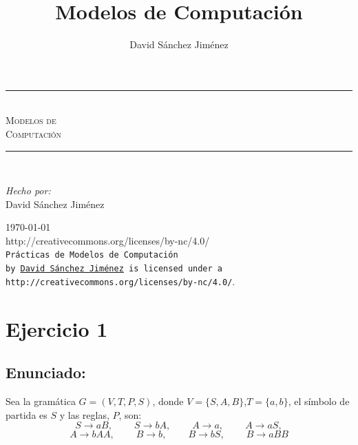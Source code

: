 \documentclass[10pt,a4paper,spanish]{report}
\title{Modelos de Computación}
\author{David Sánchez Jiménez}
\newcommand{\HRule}{\rule{\linewidth}{0.5mm}} %
\begin{document}
\begin{titlepage}
	\begin{center}
		\HRule \\[0.8cm]
		\textsc{\huge Modelos de\\[0.5cm] Computación}\\[1.6cm]
		\HRule \\[1cm]
		\begin{flushleft}
			\emph{Hecho por:}\\
			David Sánchez Jiménez
		\end{flushleft}
		\vspace{12cm}
		\large{\today}\\
		\vspace{0.5cm}
		{http://creativecommons.org/licenses/by-nc/4.0/}\\[0.5cm]
		\texttt{Prácticas de Modelos de Computación\\ by
			\href{mailto:dasaji92@gmail.com}{David Sánchez Jiménez} is licensed under a 
			{http://creativecommons.org/licenses/by-nc/4.0/}}.\\[3mm]
	\end{center}
\end{titlepage}

\tableofcontents
\newpage


\chapter{Ejercicio 1}
\section{Enunciado:}

\noindent
Sea la gramática $G = (V,T,P,S)$, donde $V = \{S,A,B\}$,$T=\{a,b\}$, el símbolo de partida es $S$ y las reglas, $P$, son:
\begin{displaymath}
	S \rightarrow aB, \qquad\ S \rightarrow bA, \qquad\ A \rightarrow a, \qquad\ A \rightarrow aS,
\end{displaymath}
\begin{displaymath}
	A \rightarrow bAA, \qquad\ B \rightarrow b, \qquad\ B \rightarrow bS, \qquad\ B \rightarrow aBB
\end{displaymath}
\end{document}

